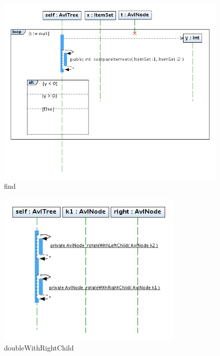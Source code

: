 \begin{figure}
\includegraphics[width=1.2\textwidth]{imgsSecuencia/AvlTree/find.png}
\caption{find}
\end{figure}
\newpage


\begin{figure}
\centering
\includegraphics[width=0.8\textwidth]{imgsSecuencia/AvlTree/doubleWithRightChild.png}
\caption{doubleWithRightChild}
\end{figure}
\newpage


